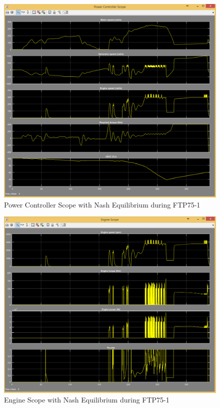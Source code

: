 \begin{figure}[h]
\centering
\includegraphics[scale=0.4]{figures/NashEquilibrium/FTP75-1/powerController13Juni}
\caption{Power Controller Scope with Nash Equilibrium during FTP75-1}
\label{fig:pcne1}
\end{figure}

\begin{figure}[h]
\centering
\includegraphics[scale=0.37]{figures/NashEquilibrium/FTP75-1/engine13Juni}
\caption{Engine Scope with Nash Equilibrium during FTP75-1}
\label{fig:ene1}
\end{figure}

